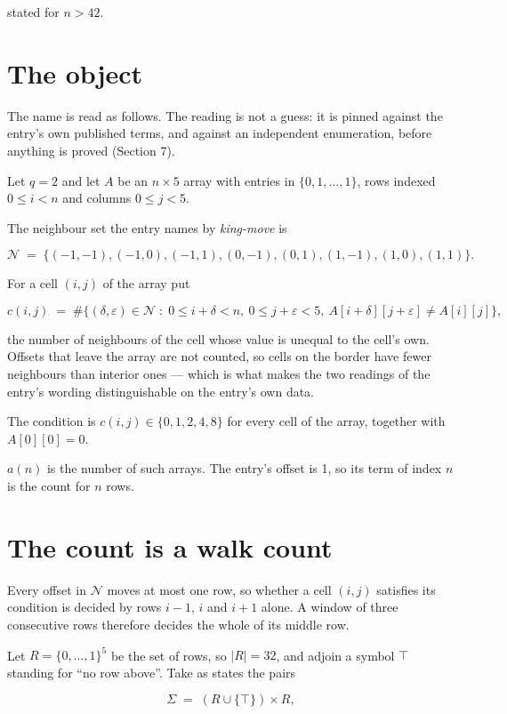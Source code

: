 \documentclass[11pt]{article}
\theoremstyle{definition}
\begin{document}
stated for $n > 42$.

\section{The object}

The name is read as follows. The reading is not a guess: it is pinned against the entry's own published terms, and against an independent enumeration, before anything is proved (Section 7).

Let $q = 2$ and let $A$ be an $n \times 5$ array with entries in $\{0,1,\dots,1\}$, rows indexed $0 \le i < n$ and columns $0 \le j < 5$.

The neighbour set the entry names by {\itshape king-move} is

\[\mathcal{N} \;=\; \{(-1,-1), (-1,0), (-1,1), (0,-1), (0,1), (1,-1), (1,0), (1,1)\}.\]

For a cell $(i,j)$ of the array put

\[c(i,j) \;=\; \#\bigl\{(\delta,\varepsilon)\in\mathcal{N} \;:\; 0\le i+\delta<n,\ 0\le j+\varepsilon<5,\ A[i+\delta][j+\varepsilon] \neq A[i][j]\bigr\},\]

the number of neighbours of the cell whose value is unequal to the cell's own. Offsets that leave the array are not counted, so cells on the border have fewer neighbours than interior ones --- which is what makes the two readings of the entry's wording distinguishable on the entry's own data.

The condition is $c(i,j) \in \{0, 1, 2, 4, 8\}$ for every cell of the array, together with $A[0][0]=0$.

$a(n)$ is the number of such arrays. The entry's offset is 1, so its term of index $n$ is the count for $n$ rows.

\section{The count is a walk count}

Every offset in $\mathcal{N}$ moves at most one row, so whether a cell $(i,j)$ satisfies its condition is decided by rows $i-1$, $i$ and $i+1$ alone. A window of three consecutive rows therefore decides the whole of its middle row.

Let $R = \{0,\dots,1\}^{5}$ be the set of rows, so $|R| = 32$, and adjoin a symbol $\top$ standing for ``no row above''. Take as states the pairs

\[\Sigma \;=\; (R \cup \{\top\}) \times R,\]
\end{document}
